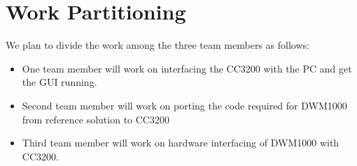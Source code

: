 \documentclass[journal,transmag]{IEEEtran}
\begin{document}
\section{Work Partitioning}
We plan to divide the work among the three team members as follows:
\begin{itemize}
    \item One team member will work on interfacing the CC3200 with the PC and get the GUI running. 
    \item Second team member will work on porting the code required for DWM1000 from reference solution to CC3200
    \item Third team member will work on hardware interfacing of DWM1000 with CC3200.
\end{itemize}




%
%

\end{document}
